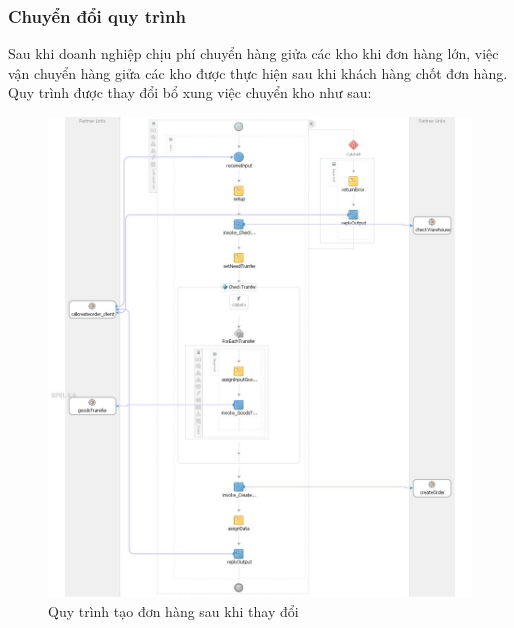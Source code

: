 \subsubsection*{Chuyển đổi quy trình}
Sau khi doanh nghiệp chịu phí chuyển hàng giửa các kho khi đơn hàng lớn, việc vận chuyển hàng giửa các kho được thực hiện sau khi khách hàng chốt đơn hàng. Quy trình được thay đổi bổ xung việc chuyển kho như sau:
\begin{figure}[!htp]
    \centering
    \includegraphics[width=14cm]{img/bpel/createOrderAfter.jpg}
    \newline
    \caption{Quy trình tạo đơn hàng sau khi thay đổi}
\end{figure}